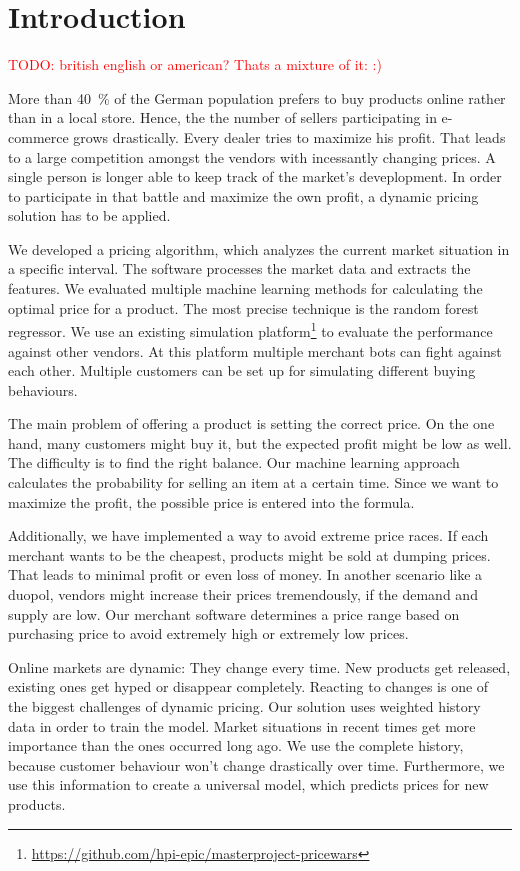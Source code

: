 \section{Introduction}

\textcolor{red}{TODO: british english or american? Thats a mixture of it: :)}

\noindent More than 40~\% of the German population prefers to buy products online rather than in a local store. \cite{shoppingStatistic} Hence, the the number of sellers participating in e-commerce grows drastically. Every dealer tries to maximize his profit. That leads to a large competition amongst the vendors with incessantly changing prices. A single person is longer able to keep track of the market's deveplopment. In order to participate in that battle and maximize the own profit, a dynamic pricing solution has to be applied.

We developed a pricing algorithm, which analyzes the current market situation in a specific interval. The software processes the market data and extracts the features. We evaluated multiple machine learning methods for calculating the optimal price for a product. The most precise technique is the random forest regressor. We use an existing simulation platform\footnote{\href{https://github.com/hpi-epic/masterproject-pricewars}{https://github.com/hpi-epic/masterproject-pricewars}} to evaluate the performance against other vendors. At this platform multiple merchant bots can fight against each other. Multiple customers can be set up for simulating different buying behaviours.

The main problem of offering a product is setting the correct price. On the one hand, many customers might buy it, but the expected profit might be low as well. The difficulty is to find the right balance. Our machine learning approach calculates the probability for selling an item at a certain time. Since we want to maximize the profit, the possible price is entered into the formula.

Additionally, we have implemented a way to avoid extreme price races. If each merchant wants to be the cheapest, products might be sold at dumping prices. That leads to minimal profit or even loss of money. In another scenario like a duopol, vendors might increase their prices tremendously, if the demand and supply are low. Our merchant software determines a price range based on purchasing price to avoid extremely high or extremely low prices.

Online markets are dynamic: They change every time. New products get released, existing ones get hyped or disappear completely. Reacting to changes is one of the biggest challenges of dynamic pricing. Our solution uses weighted history data in order to train the model. Market situations in recent times get more importance than the ones occurred long ago. We use the complete history, because customer behaviour won't change drastically over time. Furthermore, we use this information to create a universal model, which predicts prices for new products.


